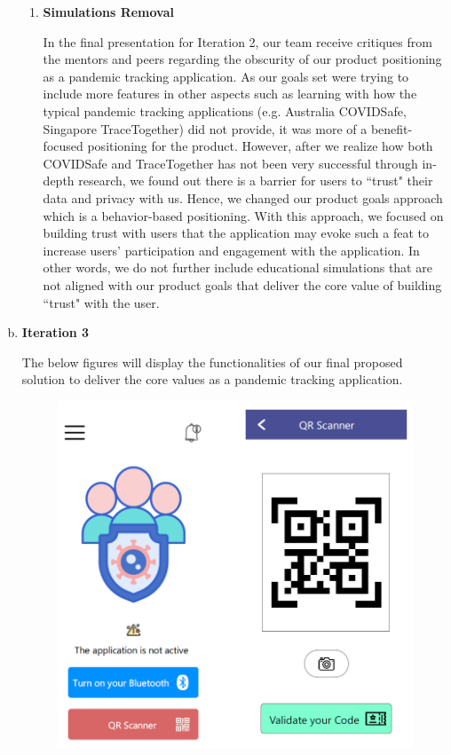 \begin{enumerate}[a)]
\begin{enumerate}[label=(\roman*)]
          \item \textbf{Simulations Removal}
            \par In the final presentation for Iteration 2, our team receive critiques from the mentors and peers regarding the obscurity of our product positioning as a pandemic tracking application. As our goals set were trying to include more features in other aspects such as learning with how the typical pandemic tracking applications (e.g. Australia COVIDSafe, Singapore TraceTogether) did not provide, it was more of a benefit-focused positioning for the product. However, after we realize how both COVIDSafe and TraceTogether has not been very successful through in-depth research, we found out there is a barrier for users to ``trust" their data and privacy with us. Hence, we changed our product goals approach which is a behavior-based positioning. With this approach, we focused on building trust with users that the application may evoke such a feat to increase users' participation and engagement with the application. In other words, we do not further include educational simulations that are not aligned with our product goals that deliver the core value of building ``trust" with the user.
        \end{enumerate}
        \item \textbf{Iteration 3}
          \par The below figures will display the functionalities of our final proposed solution to deliver the core
          values as a pandemic tracking application.
          \begin{figure}[H]
            \centering
            \includegraphics[scale=1]{img/prototype/iter3-proto-1.png}

\end{figure}
\end{enumerate}
